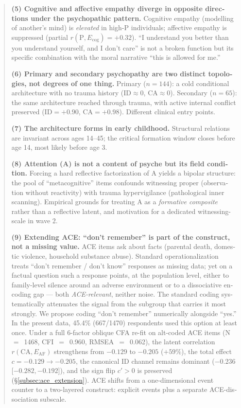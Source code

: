 \documentclass[11pt,a4paper]{article}
\begin{document}
\begin{otherlanguage}{english}
\begin{abstract}
\noindent\textbf{(5) Cognitive and affective empathy diverge in opposite directions under the psychopathic pattern.} Cognitive empathy (modelling of another's mind) is \emph{elevated} in high-P individuals; affective empathy is suppressed (partial $r(\text{P}, E_{\mathrm{cog}}) = +0.32$). ``I understand you better than you understand yourself, and I don't care'' is not a broken function but its specific combination with the moral narrative ``this is allowed for me.''

\noindent\textbf{(6) Primary and secondary psychopathy are two distinct topologies, not degrees of one thing.} Primary ($n = 144$): a cold conditional architecture with no trauma history (ID$\approx$0, CA$\approx$0). Secondary ($n = 65$): the same architecture reached through trauma, with active internal conflict preserved (ID$=+0.90$, CA$=+0.98$). Different clinical entry points.

\noindent\textbf{(7) The architecture forms in early childhood.} Structural relations are invariant across ages 14--45; the critical formation window closes before age 14, most likely before age 3.

\noindent\textbf{(8) Attention (A) is not a content of psyche but its field condition.} Forcing a hard reflective factorization of A yields a bipolar structure: the pool of ``metacognitive'' items confounds witnessing proper (observation without reactivity) with trauma hypervigilance (pathological inner scanning). Empirical grounds for treating A as a \emph{formative composite} rather than a reflective latent, and motivation for a dedicated witnessing-scale in wave 2.

\noindent\textbf{(9) Extending ACE: ``don't remember'' is part of the construct, not a missing value.} ACE items ask about facts (parental death, domestic violence, household substance abuse). Standard operationalization \citep{felitti1998} treats ``don't remember / don't know'' responses as missing data; yet on a factual question such a response points, at the population level, either to family-level silence around an adverse environment or to a dissociative encoding gap --- both \emph{ACE-relevant}, neither noise. The standard coding systematically attenuates the signal from the subgroup that carries it most strongly. We propose coding ``don't remember'' numerically alongside ``yes.'' In the present data, 45.4\% (667/1470) respondents used this option at least once. Under a full 6-factor oblique CFA re-fit on alt-coded ACE items (N~$=$~1468, CFI~$=$~0.960, RMSEA~$=$~0.062), the latent correlation $r(\text{CA}, E_{\mathrm{AF}})$ strengthens from $-0.129$ to $-0.205$ ($+59\%$), the total effect $c = -0.129 \to -0.205$, the canonical ID channel remains dominant ($-0.236$ [$-0.282, -0.192$]), and the sign flip $c'>0$ is preserved (§\ref{subsec:ace_extension}). ACE shifts from a one-dimensional event counter to a two-layered construct: explicit events plus a separate ACE-dissociation subscale.


\end{abstract}
\end{otherlanguage}
\end{document}
